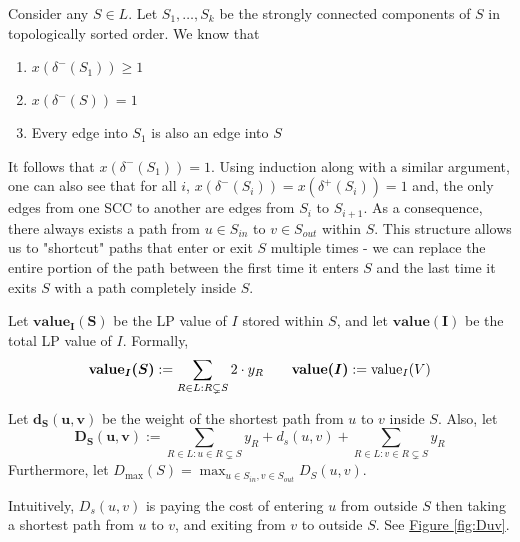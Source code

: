 
	Consider any $S\in L$. Let $S_1,\ldots, S_k$ be the strongly connected components of $S$ in topologically sorted order. We know that
	\begin{enumerate}
		\item $x(\delta^-(S_1)) \geq 1$
		\item $x(\delta^-(S)) = 1$
		\item Every edge into $S_1$ is also an edge into $S$
	\end{enumerate}
	It follows that $x(\delta^-(S_1)) = 1$. Using induction along with a similar argument, one can also see that for all $i$, $x(\delta^-(S_i)) = x(\delta^+(S_i)) = 1$ and, the only edges from one SCC to another are edges from $S_i$ to $S_{i + 1}$. 
	As a consequence, there always exists a path from $u\in S_{in}$ to $v\in S_{out}$ within $S$. This structure allows us to "shortcut" paths that enter or exit $S$ multiple times - we can replace the entire portion of the path between the first time it enters $S$ and the last time it exits $S$ with a path completely inside $S$.
	
	
	\begin{definition}\label{def:value}
		Let $\bm{\textbf{value}_I(S)}$ be the LP value of $I$ stored within $S$, and let $\bm{\textbf{value}(I)}$ be the total LP value of $I$. Formally, 
		\[
			\bm{\textbf{value}_I(S)}:=\sum\limits_{R\in L:R\subsetneq S}2\cdot y_R\qquad \bm{\textbf{value}(I)}:=\textup{value}_I(V)
		\]
	\end{definition}
	
	\begin{definition} 
		Let $\bm{d_S(u,v)}$ be the weight of the shortest path from $u$ to $v$ inside $S$. Also, let 
		\begin{equation}
			\bm{D_S(u,v)}:=\sum_{R\in L : u\in R\subsetneq S}y_R + d_s(u,v) + \sum_{R\in L : v\in R\subsetneq S}y_R\label{def:1}
		\end{equation}
		Furthermore, let $D_{\max}(S) = \max_{u \in S_{in}, v \in S_{out}}D_S(u,v)$.
		
		
		Intuitively, $D_s(u,v)$ is paying the cost of entering $u$ from outside $S$ then taking a shortest path from $u$ to $v$, and exiting from $v$ to outside $S$. See \hyperref[fig:Duv]{Figure \ref{fig:Duv}}.
	\end{definition}
	
